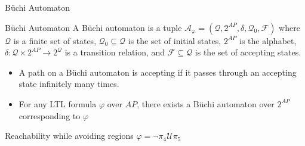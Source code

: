\documentclass{beamer}
\newcommand{\U}{\bm{\mathcal{U}}}
\begin{document}
\begin{frame}{B\"uchi Automaton}
\begin{block}{B\"uchi Automaton}
	\small A B\"uchi automaton is a tuple $\mathcal{A}_\varphi = (\mathcal{Q},2^{AP},\delta,\mathcal{Q}_0,\mathcal{F})$ where $\mathcal{Q}$ is a finite set of states, $\mathcal{Q}_0 \subseteq \mathcal{Q}$ is the set of initial states, $2^{AP}$ is the alphabet, $\delta: \mathcal{Q} \times 2^{AP} \rightarrow 2^\mathcal{Q}$ is a transition relation, and $\mathcal{F} \subseteq \mathcal{Q}$ is the set of accepting states.
	\end{block}

	\begin{itemize}
	\item {
	A path on a B\"uchi automaton is accepting if it passes through an accepting state infinitely many times.
	}
	\item {
	For any LTL formula $\varphi$ over $AP$, there exists a B\"uchi automaton over $2^{AP}$ corresponding to $\varphi$ \cite{baier08}
	}
	\end{itemize}
	Reachability while avoiding regions $\varphi = \neg \pi_4 \U \pi_5$
	
	\begin{figure}
\centering
{}
\end{figure}
\end{frame}
\end{document}

